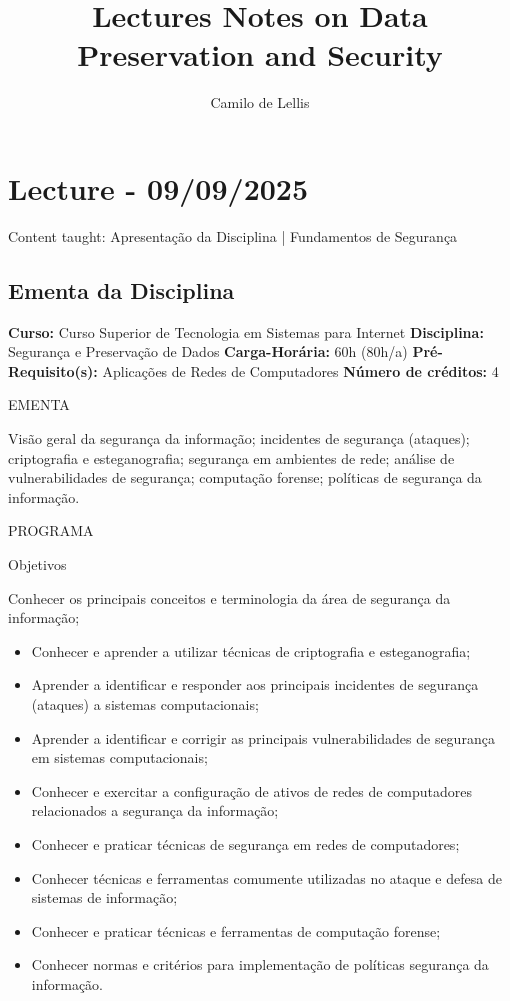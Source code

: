 \documentclass{article}
\title{Lectures Notes on Data Preservation and Security}
\author{Camilo de Lellis}
\begin{document}
\maketitle

\tableofcontents

\section{Lecture - 09/09/2025}
Content taught: Apresentação da Disciplina | Fundamentos de Segurança

\subsection{Ementa da Disciplina}
\textbf{Curso:} Curso Superior de Tecnologia em Sistemas para Internet
\textbf{Disciplina:} Segurança e Preservação de Dados \textbf{Carga-Horária:} 60h (80h/a)
\textbf{Pré-Requisito(s):} Aplicações de Redes de Computadores  \textbf{Número de créditos:} 4

\begin{center}
EMENTA
\end{center}
Visão geral da segurança da informação; incidentes de segurança (ataques); criptografia e
esteganografia; segurança em ambientes de rede; análise de vulnerabilidades de segurança;
computação forense; políticas de segurança da informação.

\begin{center}
PROGRAMA
\end{center}

\begin{center}
Objetivos
\end{center}
Conhecer os principais conceitos e terminologia da área de segurança da informação;
\begin{itemize}
      \item Conhecer e aprender a utilizar técnicas de criptografia e esteganografia;
      \item Aprender a identificar e responder aos principais incidentes de segurança (ataques) a sistemas computacionais;
      \item Aprender a identificar e corrigir as principais vulnerabilidades de segurança em sistemas computacionais;
      \item Conhecer e exercitar a configuração de ativos de redes de computadores relacionados a segurança da informação;
      \item Conhecer e praticar técnicas de segurança em redes de computadores;
      \item Conhecer técnicas e ferramentas comumente utilizadas no ataque e defesa de sistemas de informação;
      \item Conhecer e praticar técnicas e ferramentas de computação forense;
      \item Conhecer normas e critérios para implementação de políticas segurança da informação.
\end{itemize}
\end{document}
